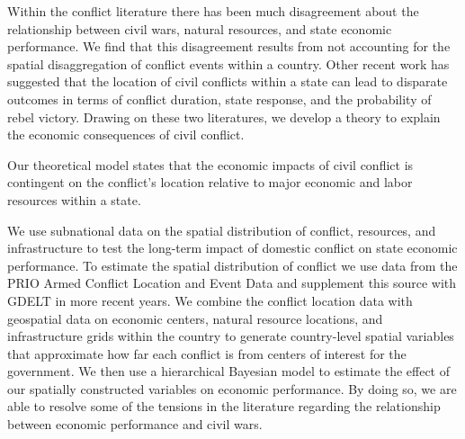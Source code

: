 Within the conflict literature there has been much disagreement about the relationship between civil wars, natural resources, and state economic performance. We find that this disagreement results from not accounting for the spatial disaggregation of conflict events within a country.  Other recent work has suggested that the location of civil conflicts within a state can lead to disparate outcomes in terms of conflict duration, state response, and the probability of rebel victory.  Drawing on these two literatures, we develop a theory to explain the economic consequences of civil conflict.

Our theoretical model states that the economic impacts of civil conflict is contingent on the conflict's location relative to major economic and labor resources within a state.

We use subnational data on the spatial distribution of conflict, resources, and infrastructure to test the long-term impact of domestic conflict on state economic performance. To estimate the spatial distribution of conflict we use data from the PRIO Armed Conflict Location and Event Data and supplement this source with GDELT in more recent years. We combine the conflict location data with geospatial data on economic centers, natural resource locations, and infrastructure grids within the country to generate country-level spatial variables that approximate how far each conflict is from centers of interest for the government. We then use a hierarchical Bayesian model to estimate the effect of our spatially constructed variables on economic performance. By doing so, we are able to resolve some of the tensions in the literature regarding the relationship between economic performance and civil wars. 